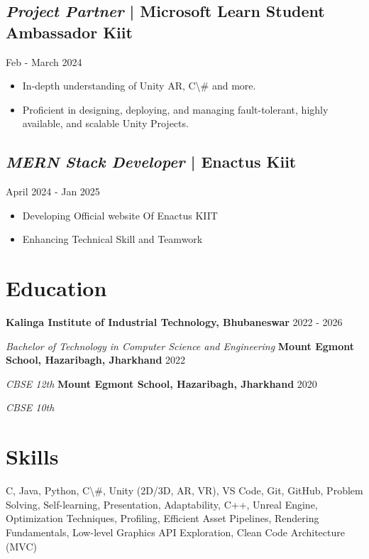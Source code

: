 \documentclass{article}%
\begin{document}
%
\subsection*{\textit{Project Partner} | Microsoft Learn Student Ambassador Kiit}%
\label{subsec:textitProjectPartner|MicrosoftLearnStudentAmbassadorKiit}%
\hfill%
Feb - March 2024%
\begin{itemize}%
\item%
In-depth understanding of Unity AR, C\textbackslash{}# and more.%
\item%
Proficient in designing, deploying, and managing fault-tolerant, highly available, and scalable Unity Projects.%
\end{itemize}

%
\subsection*{\textit{MERN Stack Developer} | Enactus Kiit}%
\label{subsec:textitMERNStackDeveloper|EnactusKiit}%
\hfill%
April 2024 - Jan 2025%
\begin{itemize}%
\item%
Developing Official website Of Enactus KIIT%
\item%
Enhancing Technical Skill and Teamwork%
\end{itemize}

%
\section*{Education}%
\label{sec:Education}%
\textbf{Kalinga Institute of Industrial Technology, Bhubaneswar} \hfill 2022 - 2026%
\par%
\textit{Bachelor of Technology in Computer Science and Engineering}%
\vspace{1em}%
\textbf{Mount Egmont School, Hazaribagh, Jharkhand} \hfill 2022%
\par%
\textit{CBSE 12th}%
\vspace{1em}%
\textbf{Mount Egmont School, Hazaribagh, Jharkhand} \hfill 2020%
\par%
\textit{CBSE 10th}%
\vspace{1em}

%
\section*{Skills}%
\label{sec:Skills}%
C, Java, Python, C\textbackslash{}#, Unity (2D/3D, AR, VR), VS Code, Git, GitHub, Problem Solving, Self-learning, Presentation, Adaptability, C++, Unreal Engine, Optimization Techniques, Profiling, Efficient Asset Pipelines, Rendering Fundamentals, Low-level Graphics API Exploration, Clean Code Architecture (MVC)

%
\end{document}

